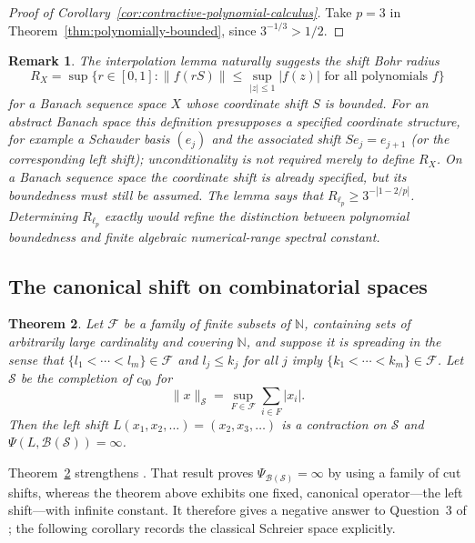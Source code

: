 \documentclass[10pt,a4paper]{amsart}
\newtheorem{theorem}{Theorem}[section]
\newtheorem{remark}[theorem]{Remark}
\newcommand{\N}{\mathbb N}
\newcommand{\calB}{\mathcal B}
\newcommand{\calF}{\mathcal F}
\newcommand{\calS}{\mathcal S}
\begin{document}
\begin{proof}[Proof of Corollary~\ref{cor:contractive-polynomial-calculus}]
Take $p=3$ in Theorem~\ref{thm:polynomially-bounded}, since $3^{-1/3}>1/2$.
\end{proof}

\begin{remark}
The interpolation lemma naturally suggests the shift Bohr radius
\[
       R_X=\sup\{r\in[0,1]:\|f(rS)\|\leqslant\sup_{|z|\leqslant1}|f(z)|\text{ for all polynomials }f\}
\]
for a Banach sequence space $X$ whose coordinate shift $S$ is bounded.  For an abstract Banach space this definition presupposes a specified coordinate structure, for example a Schauder basis $(e_j)$ and the associated shift $Se_j=e_{j+1}$ (or the corresponding left shift); unconditionality is not required merely to define $R_X$.  On a Banach sequence space the coordinate shift is already specified, but its boundedness must still be assumed.  The lemma says that $R_{\ell_p}\geqslant3^{-|1-2/p|}$.  Determining $R_{\ell_p}$ exactly would refine the distinction between polynomial boundedness and finite algebraic numerical-range spectral constant.
\end{remark}

\subsection{The canonical shift on combinatorial spaces}\label{sec:shift-obstructions}

\begin{theorem}\label{thm:combinatorial}
Let $\calF$ be a family of finite subsets of $\N$, containing sets of arbitrarily large cardinality and covering $\N$, and suppose it is spreading in the sense that $\{l_1<\cdots<l_m\}\in\calF$ and $l_j\leqslant k_j$ for all $j$ imply $\{k_1<\cdots<k_m\}\in\calF$.  Let $\calS$ be the completion of $c_{00}$ for
\[
       \|x\|_{\calS}=\sup_{F\in\calF}\sum_{i\in F}|x_i|.
\]
Then the left shift $L(x_1,x_2,\ldots)=(x_2,x_3,\ldots)$ is a contraction on $\calS$ and $\Psi(L,\calB(\calS))=\infty$.
\end{theorem}

Theorem~\ref{thm:combinatorial} strengthens \cite[Theorem~6.3]{BHDVW}.  That result proves $\Psi_{\calB(\calS)}=\infty$ by using a family of cut shifts, whereas the theorem above exhibits one fixed, canonical operator---the left shift---with infinite constant.  It therefore gives a negative answer to Question~3 of \cite[Section~8]{BHDVW}; the following corollary records the classical Schreier space explicitly.
\end{document}
